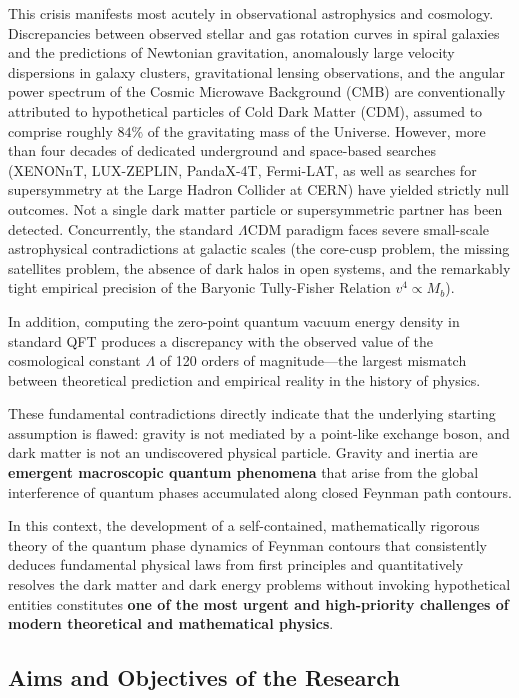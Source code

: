 \documentclass[11pt,a4paper]{article}
\theoremstyle{definition}
\begin{document}
This crisis manifests most acutely in observational astrophysics and cosmology. Discrepancies between observed stellar and gas rotation curves in spiral galaxies and the predictions of Newtonian gravitation, anomalously large velocity dispersions in galaxy clusters, gravitational lensing observations, and the angular power spectrum of the Cosmic Microwave Background (CMB) are conventionally attributed to hypothetical particles of Cold Dark Matter (CDM), assumed to comprise roughly $84\%$ of the gravitating mass of the Universe. However, more than four decades of dedicated underground and space-based searches (XENONnT, LUX-ZEPLIN, PandaX-4T, Fermi-LAT, as well as searches for supersymmetry at the Large Hadron Collider at CERN) have yielded strictly null outcomes. Not a single dark matter particle or supersymmetric partner has been detected. Concurrently, the standard $\Lambda\text{CDM}$ paradigm faces severe small-scale astrophysical contradictions at galactic scales (the core-cusp problem, the missing satellites problem, the absence of dark halos in open systems, and the remarkably tight empirical precision of the Baryonic Tully-Fisher Relation $v^4 \propto M_b$).

In addition, computing the zero-point quantum vacuum energy density in standard QFT produces a discrepancy with the observed value of the cosmological constant $\Lambda$ of 120 orders of magnitude---the largest mismatch between theoretical prediction and empirical reality in the history of physics.

These fundamental contradictions directly indicate that the underlying starting assumption is flawed: gravity is not mediated by a point-like exchange boson, and dark matter is not an undiscovered physical particle. Gravity and inertia are \textbf{emergent macroscopic quantum phenomena} that arise from the global interference of quantum phases accumulated along closed Feynman path contours.

In this context, the development of a self-contained, mathematically rigorous theory of the quantum phase dynamics of Feynman contours that consistently deduces fundamental physical laws from first principles and quantitatively resolves the dark matter and dark energy problems without invoking hypothetical entities constitutes \textbf{one of the most urgent and high-priority challenges of modern theoretical and mathematical physics}.

\subsection{Aims and Objectives of the Research}\label{subsec:aims}
\end{document}
